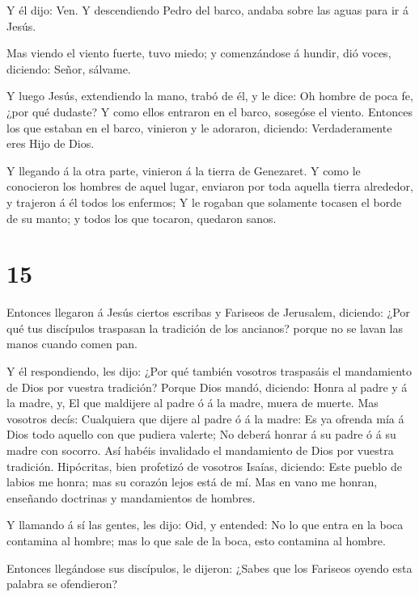  Y él dijo: Ven. Y descendiendo Pedro del barco, andaba
sobre las aguas para ir á Jesús.

 Mas viendo el viento fuerte, tuvo miedo; y comenzándose á
hundir, dió voces, diciendo: Señor, sálvame.

 Y luego Jesús, extendiendo la mano, trabó de él, y le
dice: Oh hombre de poca fe, ¿por qué dudaste?  Y como ellos
entraron en el barco, sosegóse el viento.  Entonces los que
estaban en el barco, vinieron y le adoraron, diciendo: Verdaderamente
eres Hijo de Dios.

 Y llegando á la otra parte, vinieron á la tierra de
Genezaret.  Y como le conocieron los hombres de aquel
lugar, enviaron por toda aquella tierra alrededor, y trajeron á él todos
los enfermos;  Y le rogaban que solamente tocasen el borde
de su manto; y todos los que tocaron, quedaron sanos.

\hypertarget{section-14}{%
\section{15}\label{section-14}}

 Entonces llegaron á Jesús ciertos escribas y Fariseos de
Jerusalem, diciendo:  ¿Por qué tus discípulos traspasan la
tradición de los ancianos? porque no se lavan las manos cuando comen
pan.

 Y él respondiendo, les dijo: ¿Por qué también vosotros
traspasáis el mandamiento de Dios por vuestra tradición? 
Porque Dios mandó, diciendo: Honra al padre y á la madre, y, El que
maldijere al padre ó á la madre, muera de muerte.  Mas
vosotros decís: Cualquiera que dijere al padre ó á la madre: Es ya
ofrenda mía á Dios todo aquello con que pudiera valerte;  No
deberá honrar á su padre ó á su madre con socorro. Así habéis invalidado
el mandamiento de Dios por vuestra tradición.  Hipócritas,
bien profetizó de vosotros Isaías, diciendo:  Este pueblo de
labios me honra; mas su corazón lejos está de mí.  Mas en
vano me honran, enseñando doctrinas y mandamientos de hombres.

 Y llamando á sí las gentes, les dijo: Oid, y entended:
 No lo que entra en la boca contamina al hombre; mas lo que
sale de la boca, esto contamina al hombre.

 Entonces llegándose sus discípulos, le dijeron: ¿Sabes que
los Fariseos oyendo esta palabra se ofendieron?

